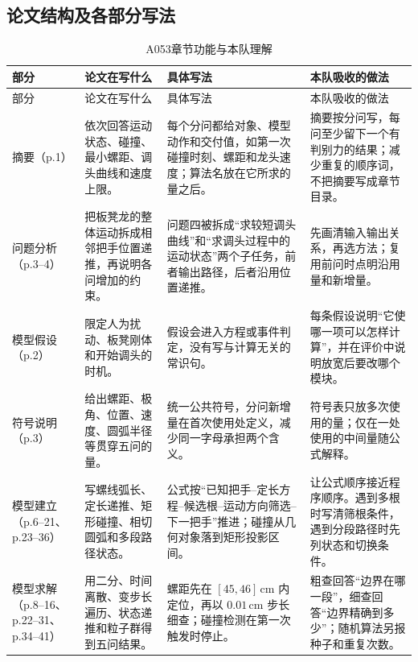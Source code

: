 \documentclass[UTF8,zihao=-4]{ctexart}
\begin{document}
\subsection{论文结构及各部分写法}

\small
\begin{longtable}{p{2.25cm}p{4.0cm}p{5.1cm}p{4.2cm}}
\caption{A053章节功能与本队理解}\label{tab:a053-structure}\\
\toprule
部分 & 论文在写什么 & 具体写法 & 本队吸收的做法\\
\midrule
\endfirsthead
\toprule
部分 & 论文在写什么 & 具体写法 & 本队吸收的做法\\
\midrule
\endhead
\bottomrule
\endfoot
摘要（p.1）
& 依次回答运动状态、碰撞、最小螺距、调头曲线和速度上限。
& 每个分问都给对象、模型动作和交付值，如第一次碰撞时刻、螺距和龙头速度；算法名放在它所求的量之后。
& 摘要按分问写，每问至少留下一个有判别力的结果；减少重复的顺序词，不把摘要写成章节目录。\\

问题分析（p.3--4）
& 把板凳龙的整体运动拆成相邻把手位置递推，再说明各问增加的约束。
& 问题四被拆成“求较短调头曲线”和“求调头过程中的运动状态”两个子任务，前者输出路径，后者沿用位置递推。
& 先画清输入输出关系，再选方法；复用前问时点明沿用量和新增量。\\

模型假设（p.2）
& 限定人为扰动、板凳刚体和开始调头的时机。
& 假设会进入方程或事件判定，没有写与计算无关的常识句。
& 每条假设说明“它使哪一项可以怎样计算”，并在评价中说明放宽后要改哪个模块。\\

符号说明（p.3）
& 给出螺距、极角、位置、速度、圆弧半径等贯穿五问的量。
& 统一公共符号，分问新增量在首次使用处定义，减少同一字母承担两个含义。
& 符号表只放多次使用的量；仅在一处使用的中间量随公式解释。\\

模型建立（p.6--21、p.23--36）
& 写螺线弧长、定长递推、矩形碰撞、相切圆弧和多段路径状态。
& 公式按“已知把手--定长方程--候选根--运动方向筛选--下一把手”推进；碰撞从几何对象落到矩形投影区间。
& 让公式顺序接近程序顺序。遇到多根时写清筛根条件，遇到分段路径时先列状态和切换条件。\\

模型求解（p.8--16、p.22--31、p.34--41）
& 用二分、时间离散、变步长遍历、状态递推和粒子群得到五问结果。
& 螺距先在 $[45,46]\,\mathrm{cm}$ 内定位，再以 $0.01\,\mathrm{cm}$ 步长细查；碰撞检测在第一次触发时停止。
& 粗查回答“边界在哪一段”，细查回答“边界精确到多少”；随机算法另报种子和重复次数。\\


\end{longtable}
\end{document}
